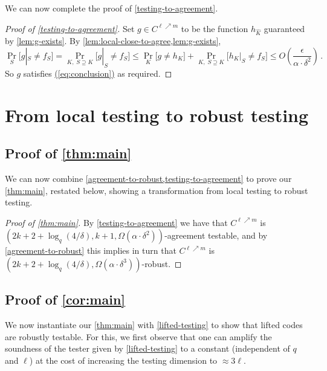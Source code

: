 \documentclass[11pt]{article}
\numberwithin{equation}{section}
\theoremstyle{definition}
\theoremstyle{plain}
\renewcommand{\eqref}[1]{\hyperref[#1]{(\ref*{#1})}}
\theoremstyle{plain}
\begin{document}
We can now complete the proof of \cref{testing-to-agreement}.

\begin{proof}[Proof of \cref{testing-to-agreement}]
Set $g \in C^{\ell \nearrow m}$  to be the function $h_{\hat K}$ guaranteed  by \cref{lem:g-exists}.
By \cref{lem:local-close-to-agree,lem:g-exists},
\[
\Pr_S\big[g|_S \neq f_S\big] =\Pr_{K, \; S \supseteq K}\big[g|_S \neq f_S\big]   \leq \Pr_{K}\big[g \neq h_{K}\big] + \Pr_{K, \; S \supseteq K}\big[h_{K}|_S \neq f_S\big] \leq O\left(\frac{\epsilon} {\alpha \cdot \delta^2}\right)\,.
\]
So $g$ satisfies \eqref{eq:conclusion} as required.
\end{proof}

\section{From local testing to robust testing}\label{sec:testing-to-robust}

\subsection{Proof of \cref{thm:main}}

We can now combine  \cref{agreement-to-robust,testing-to-agreement} to prove our \cref{thm:main}, restated below, showing a transformation from local testing to robust testing.

\maint*

%
%
%
%
%
%

\begin{proof}[Proof of \cref{thm:main}]
%
%

By \cref{testing-to-agreement} we have that $C^{\ell \nearrow m}$ is
$(2k+2+\log_q(4/\delta), k+1, \Omega(\alpha \cdot \delta^2))$-agreement testable, and by \cref{agreement-to-robust} this implies in turn that $C^{\ell \nearrow m}$ is $(2k+2+\log_q(4/\delta),  \Omega(\alpha \cdot \delta^3))$-robust.
\end{proof}


\subsection{Proof of \cref{cor:main}}

We now instantiate our \cref{thm:main} with \cref{lifted-testing} to show that lifted codes are robustly testable. For this, we first observe that
one can amplify the soundness of the tester given by \cref{lifted-testing}
to a constant (independent of $q$ and $\ell$) at the cost of increasing the testing dimension to $\approx 3\ell$.
\end{document}
